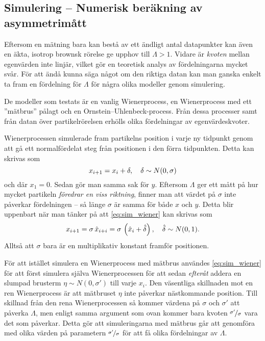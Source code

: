 
\subsection{Simulering -- Numerisk beräkning av asymmetrimått} %
Eftersom en mätning bara kan bestå av ett ändligt antal datapunkter kan även en äkta, isotrop brownsk rörelse ge upphov till $\varLambda>1$. Vidare är \emph{kvoten} mellan egenvärden inte linjär, vilket gör en teoretisk analys av fördelningarna mycket svår. För att ändå kunna säga något om den riktiga datan kan man ganska enkelt ta fram en fördelning för $\varLambda$ för några olika modeller genom simulering. 

De modeller som testats är en vanlig Wienerprocess, en Wienerprocess med ett ''mätbrus'' pålagt och en Ornstein–Uhlenbeck-process. Från dessa processer samt från datan över partikelrörelsen erhölls olika fördelningar av egenvärdeskvoter. 

Wienerprocessen simulerade fram partikelns position i varje ny tidpunkt genom att gå ett normalfördelat steg från positionen i den förra tidpunkten. Detta kan skrivas som
\begin{equation}\label{eq:sim_wiener}
x_{i+1} = x_i + \delta 
\qcomma  \delta \sim N(0, \sigma)
\end{equation}
och där $x_1=0$. Sedan gör man samma sak för $y$. Eftersom $\varLambda$ ger ett mått på hur mycket partikeln \emph{föredrar en viss riktning}, finner man att värdet på $\sigma$ inte påverkar fördelningen -- så länge $\sigma$ är samma för både $x$ och $y$. Detta blir uppenbart när man tänker på att \eqref{eq:sim_wiener} kan skrivas som 
\begin{equation}
x_{i+1} =\sigma\,\hat{x}_{i+i} = \sigma\,\left( \hat{x}_i + \hat{\delta} \right) 
\qcomma  \hat{\delta} \sim N(0, 1).
\end{equation}
Alltså att $\sigma$ bara är en multiplikativ konstant framför positionen.

För att istället simulera en Wienerprocess med mätbrus användes \eqref{eq:sim_wiener} för att först simulera själva Wienerprocessen för att sedan \emph{efteråt} addera en slumpad brusterm $\eta \sim N(0, \sigma')$ till varje $x_i$. Den väsentliga skillnaden mot en ren Wienerprocess är att mätbruset $\eta$ inte påverkar nästkommande position. Till skillnad från den rena Wienerprocessen så kommer värdena på $\sigma$ och $\sigma'$ att påverka $\varLambda$, men enligt samma argument som ovan kommer bara kvoten $\nicefrac{\sigma'}{\sigma}$ vara det som påverkar. Detta gör att simuleringarna med mätbrus går att genomföra med olika värden på parametern $\nicefrac{\sigma'}{\sigma}$ för att få olika fördelningar av $\varLambda$. 

